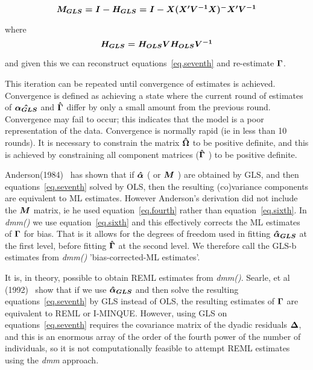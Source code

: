 \documentclass[titlepage]{article}  %
\begin{document}
\begin{displaymath}
\mbox{\boldmath $M_{GLS} = I - H_{GLS} = I - X(X^{\prime}V^{-1}X)^{-}X^{\prime}V^{-1} $}
\end{displaymath}

where
\begin{displaymath}
\mbox{\boldmath $H_{GLS} = H_{OLS}VH_{OLS}V^{-1}$}
\end{displaymath}

and given this we can reconstruct equations~\ref{eq.seventh} and re-estimate $\mbox{\boldmath $\Gamma$}$.

This iteration can be repeated until convergence of estimates is achieved. Convergence is defined  as achieving a state where the current round of estimates of $\mbox{\boldmath $\hat{\alpha_{GLS}}$}$ and $\mbox{\boldmath $\hat{\Gamma}$}$ differ by only a small amount from the previous round. Convergence may fail to occur; this indicates that the model is a poor representation of the data. Convergence is normally rapid (ie in less than 10 rounds). It is necessary to constrain the matrix $\mbox{\boldmath $\hat{\Omega}$}$ to be positive definite, and this is achieved by constraining all component matrices ($\mbox{\boldmath $\hat{\Gamma}$}$ ) to be positive definite.

Anderson(1984)~\cite{ande:84} has shown that if $\mbox{\boldmath $\hat{\alpha}$}$ ( or $\mbox{\boldmath $M$}$ ) are obtained by GLS, and then equations~\ref{eq.seventh} solved by OLS, then the resulting (co)variance components are equivalent to ML estimates. However Anderson's derivation did not include the $\mbox{\boldmath $M$}$ matrix, ie he used equation~\ref{eq.fourth} rather than equation~\ref{eq.sixth}. In {\em dmm()} we use equation~\ref{eq.sixth} and this effectively corrects the ML estimates of $\mbox{\boldmath $\Gamma$}$ for bias. That is it allows for the degrees of freedom used in fitting $\mbox{\boldmath $\hat{\alpha}_{GLS}$}$ at the first level, before fitting $\mbox{\boldmath $\hat{\Gamma}$}$ at the second level. We therefore call the GLS-b estimates from {\em dmm()} 'bias-corrected-ML estimates'.

It is, in theory, possible to obtain REML estimates from {\em dmm()}. Searle, et al (1992)~\cite{sear:92} show that if we use $\mbox{\boldmath $\hat{\alpha}_{GLS}$}$ and then solve the resulting equations~\ref{eq.seventh} by GLS instead of OLS, the resulting estimates of $\mbox{\boldmath $\Gamma$}$ are equivalent to REML or I-MINQUE. However, using GLS on equations~\ref{eq.seventh} requires the covariance matrix of the dyadic residuals $\mbox{\boldmath $\Delta$}$, and this is an enormous array of the order of the fourth power of the number of individuals, so it is not computationally feasible to attempt REML estimates using the {\em dmm} approach.
\end{document}
